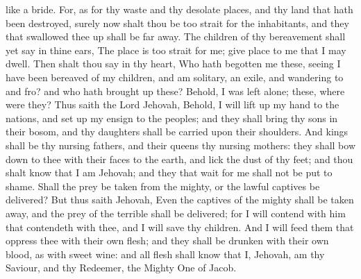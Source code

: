 like a bride. For, as for thy waste and thy desolate places, and thy land that hath been destroyed, surely now shalt thou be too strait for the inhabitants, and they that swallowed thee up shall be far away. The children of thy bereavement shall yet say in thine ears, The place is too strait for me; give place to me that I may dwell. Then shalt thou say in thy heart, Who hath begotten me these, seeing I have been bereaved of my children, and am solitary, an exile, and wandering to and fro? and who hath brought up these? Behold, I was left alone; these, where were they?  Thus saith the Lord Jehovah, Behold, I will lift up my hand to the nations, and set up my ensign to the peoples; and they shall bring thy sons in their bosom, and thy daughters shall be carried upon their shoulders. And kings shall be thy nursing fathers, and their queens thy nursing mothers: they shall bow down to thee with their faces to the earth, and lick the dust of thy feet; and thou shalt know that I am Jehovah; and they that wait for me shall not be put to shame.  Shall the prey be taken from the mighty, or the lawful captives be delivered? But thus saith Jehovah, Even the captives of the mighty shall be taken away, and the prey of the terrible shall be delivered; for I will contend with him that contendeth with thee, and I will save thy children. And I will feed them that oppress thee with their own flesh; and they shall be drunken with their own blood, as with sweet wine: and all flesh shall know that I, Jehovah, am thy Saviour, and thy Redeemer, the Mighty One of Jacob. 

